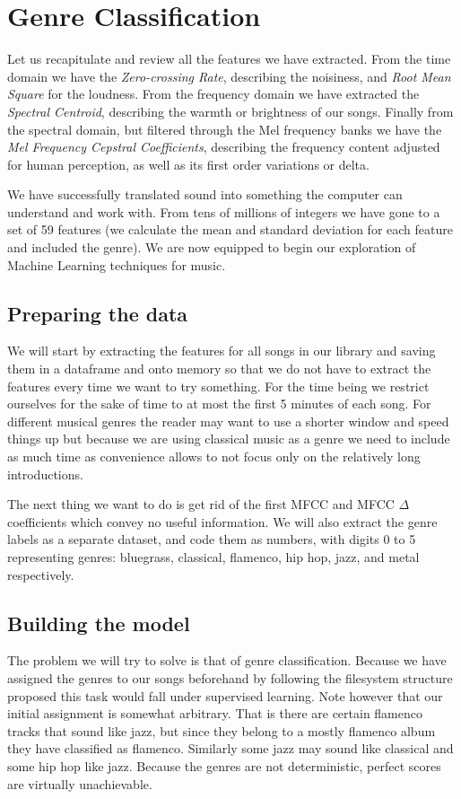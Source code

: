 \documentclass[12pt]{article}
\begin{document}
\medskip

\newpage

\section*{Genre Classification}

Let us recapitulate and review all the features we have extracted. From the time domain we have the \textit{Zero-crossing Rate}, describing the noisiness, and \textit{Root Mean Square} for the loudness. From the frequency domain we have extracted the \textit{Spectral Centroid}, describing the warmth or brightness of our songs. Finally from the spectral domain, but filtered through the Mel frequency banks we have the \textit{Mel Frequency Cepstral Coefficients}, describing the frequency content adjusted for human perception, as well as its first order variations or delta.
\medskip

We have successfully translated sound into something the computer can understand and work with. From tens of millions of integers we have gone to a set of 59 features (we calculate the mean and standard deviation for each feature and included the genre). We are now equipped to begin our exploration of Machine Learning techniques for music.

\subsection*{Preparing the data}
We will start by extracting the features for all songs in our library and saving them in a dataframe and onto memory so that we do not have to extract the features every time we want to try something. For the time being we restrict ourselves for the sake of time to at most the first 5 minutes of each song. For different musical genres the reader may want to use a shorter window and speed things up but because we are using classical music as a genre we need to include as much time as convenience allows to not focus only on the relatively long introductions.
\medskip

The next thing we want to do is get rid of the first MFCC and MFCC $\Delta$ coefficients which convey no useful information. We will also extract the genre labels as a separate dataset, and code them as numbers, with digits 0 to 5 representing genres: bluegrass, classical, flamenco, hip hop, jazz, and metal respectively.

\subsection*{Building the model}
The problem we will try to solve is that of genre classification. Because we have assigned the genres to our songs beforehand by following the filesystem structure proposed this task would fall under supervised learning. Note however that our initial assignment is somewhat arbitrary. That is there are certain flamenco tracks that sound like jazz, but since they belong to a mostly flamenco album they have classified as flamenco. Similarly some jazz may sound like classical and some hip hop like jazz. Because the genres are not deterministic, perfect scores are virtually unachievable.
\medskip
\end{document}
